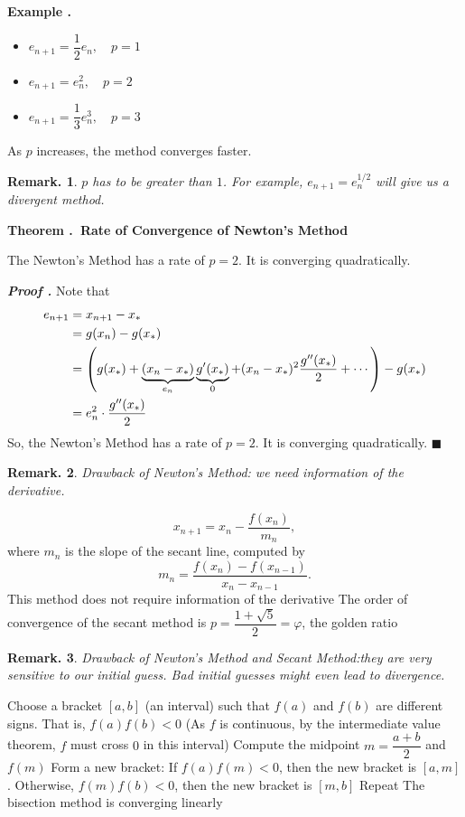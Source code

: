 \documentclass[12pt, a4paper]{article}
\newcounter{index}[subsection]
\newenvironment*{eg}[1]{\begin{framed}\par\noindent\textbf{Example \thesubsection.\stepcounter{index}\theindex\ #1} \par}{\par\end{framed}}
\newenvironment*{thm}[1]{\begin{tcolorbox}\par\noindent\textbf{Theorem \thesubsection.\stepcounter{index}\theindex\ #1} \par}{\par\end{tcolorbox}}
\newcounter{nprf}[subsection]
\newenvironment*{prf}{\par\indent\textbf{\textit{Proof \stepcounter{nprf}\thenprf.}}}{\hfill$\blacksquare$\par}
\newtheorem{rmk}{Remark.}[section]
\def\phi{\varphi}
\begin{document}
\begin{eg}{}
	\begin{itemize}
		\item $e_{n+1}=\dfrac{1}{2}e_n,\quad p=1$
		\item $e_{n+1}=e_n^2,\quad p=2$
		\item $e_{n+1}=\dfrac{1}{3}e_n^3,\quad p=3$
	\end{itemize}
	As $p$ increases, the method converges faster. 
	\begin{rmk}$p$ has to be greater than $1$. For example, $e_{n+1}=e_n^{1/2}$ will give us a divergent method. \end{rmk}
\end{eg}
\begin{thm}{Rate of Convergence of Newton's Method}
	The Newton's Method has a rate of $p=2$. It is converging quadratically. 
\end{thm}
\begin{prf}
	Note that \begin{align*}e_{n+1}&=x_{n+1}-x_*\\&=g(x_n)-g(x_*)\\&=\qty(g(x_*)+\underbrace{(x_n-x_*)}_{e_n}\underbrace{g'(x_*)}_{0}+(x_n-x_*)^2\dfrac{g''(x_*)}{2}+\cdots)-g(x_*)\\&=e_n^2\cdot\dfrac{g''(x_*)}{2}\end{align*} So, the Newton's Method has a rate of $p=2$. It is converging quadratically. 
\end{prf}
\begin{rmk} Drawback of Newton's Method: we need information of the derivative. \end{rmk}
\begin{algorithm}
	\caption{Secant Method}
	\[x_{n+1}=x_n-\dfrac{f(x_n)}{m_n},\] where $m_n$ is the slope of the secant line, computed by \[m_n=\dfrac{f(x_n)-f(x_{n-1})}{x_n-x_{n-1}}.\] This method does not require information of the derivative\;
	The order of convergence of the secant method is $p=\dfrac{1+\sqrt{5}}{2}=\phi$, the golden ratio\;
\end{algorithm}
\begin{rmk} Drawback of Newton's Method and Secant Method:they are very sensitive to our initial guess. Bad initial guesses might even lead to divergence.  \end{rmk}
\begin{algorithm}
	\caption{Bisection Method}
	Choose a bracket $[a,b]$ (an interval) such that $f(a)$ and $f(b)$ are different signs. That is, $f(a)f(b)<0$ (As $f$ is continuous, by the intermediate value theorem, $f$ must cross $0$ in this interval)\;
	Compute the midpoint $m=\dfrac{a+b}{2}$ and $f(m)$\;
	Form a new bracket: If $f(a)f(m)<0$, then the new bracket is $[a,m]$. Otherwise, $f(m)f(b)<0$, then the new bracket is $[m,b]$\;
	Repeat\;
	The bisection method is converging linearly\;
\end{algorithm}
\end{document}
